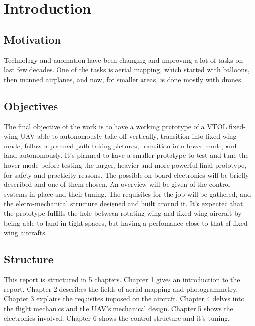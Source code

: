 

\chapter{Introduction} \label{chap:1}



\section{Motivation}
Technology and auomation have been changing and improving a lot of tasks on last few decades.
%
One of the tasks is aerial mapping, which started with balloons, then manned airplanes, and now, for smaller areas, is done mostly with drones
%

%
%
% 
%
%


\section{Objectives}

%
The final objective of the work is to have a working prototype of a VTOL fixed-wing UAV able to autonomously take off vertically, transition into fixed-wing mode, follow a planned path taking pictures, transition into hover mode, and land autonomously.
%
It's planned to have a smaller prototype to test and tune the hover mode before testing the larger, heavier and more powerful final prototype, for safety and practicity reasons.
%
The possible on-board electronics will be briefly described and one of them chosen.
%
An overview will be given of the control systems in place and their tuning.
%
The requisites for the job will be gathered, and the eletro-mechanical structure designed and built around it.
%
It's expected that the prototype fulfills the hole between rotating-wing and fixed-wing aircraft by being able to land in tight spaces, but having a perfomance close to that of fixed-wing aircrafts. 

%
\section{Structure}

%
This report is structured in 5 chapters.
%
Chapter 1 gives an introduction to the report.
%
Chapter 2 describes the fields of aerial mapping and photogrammetry.
%
Chapter 3 explains the requisites imposed on the aircraft.
%
Chapter 4 delves into the flight mechanics and the UAV's mechanical design.
%
Chapter 5 shows the electronics involved.
%
Chapter 6 shows the control structure and it's tuning.


